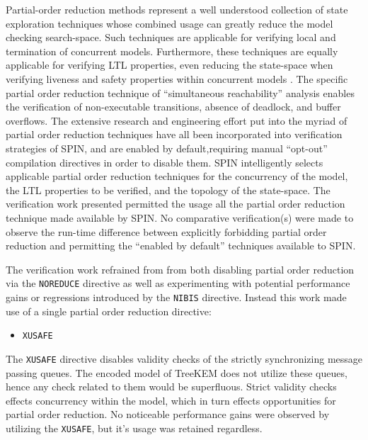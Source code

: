 Partial-order reduction methods represent a well understood collection of state exploration techniques \autocite{godefroid1990using, godefroid1991using, godefroid1994partial, holzmann1995improvement, katz1992verification, peled1993all, valmari1989stubborn, valmari1991stubborn} whose combined usage can greatly reduce the model checking search-space.
Such techniques are applicable for verifying local and termination of concurrent models.
Furthermore, these techniques are equally applicable for verifying LTL properties, even reducing the state-space when verifying liveness and safety properties within concurrent models \autocite{wolper1983reasoning}.
The specific partial order reduction technique of ``simultaneous reachability'' analysis \autocite{van1997partial} enables the verification of non-executable transitions, absence of deadlock, and buffer overflows.
The extensive research and engineering effort put into the myriad of partial order reduction techniques have all been incorporated into verification strategies of SPIN, and are enabled by default,requiring manual ``opt-out'' compilation directives in order to disable them.
SPIN intelligently selects applicable partial order reduction techniques for the concurrency of the model, the LTL properties to be verified, and the topology of the state-space.
The verification work presented permitted the usage all the partial order reduction technique made available by SPIN.\@
No comparative verification(s) were made to observe the run-time difference between explicitly forbidding partial order reduction and permitting the ``enabled by default'' techniques available to SPIN.\@

The verification work refrained from from both disabling partial order reduction via the \texttt{NOREDUCE} directive as well as experimenting with potential performance gains or regressions introduced by the \texttt{NIBIS} directive.
Instead this work made use of a single partial order reduction directive:

\begin{itemize}
\item \texttt{XUSAFE}
\end{itemize}

The \texttt{XUSAFE} directive disables validity checks of the strictly synchronizing message passing queues.
The encoded model of TreeKEM does not utilize these queues, hence any check related to them would be superfluous.
Strict validity checks effects concurrency within the model, which in turn effects opportunities for partial order reduction.
No noticeable performance gains were observed by utilizing the \texttt{XUSAFE}, but it's usage was retained regardless.


